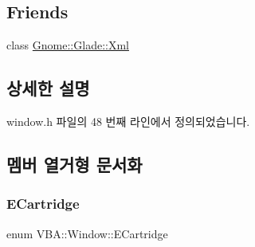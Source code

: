 \subsection*{Friends}
\begin{DoxyCompactItemize}
\item 
class \mbox{\hyperlink{class_v_b_a_1_1_window_af61c9d83735058c67bfeb2f2bbc43c47}{Gnome\+::\+Glade\+::\+Xml}}
\end{DoxyCompactItemize}


\subsection{상세한 설명}


window.\+h 파일의 48 번째 라인에서 정의되었습니다.



\subsection{멤버 열거형 문서화}
\mbox{\label{class_v_b_a_1_1_window_af580451d3ee7a738a73434858a08fa65}} 
\subsubsection{\texorpdfstring{E\+Cartridge}{ECartridge}}
{\footnotesize\ttfamily enum V\+B\+A\+::\+Window\+::\+E\+Cartridge}

